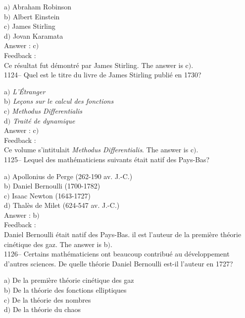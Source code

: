 ﻿\documentclass[letterpaper, 12pt]{article}
\begin{document}
a$)$ Abraham Robinson \\
b$)$ Albert Einstein \\
c$)$ James Stirling  \\
d$)$ Jovan Karamata\\

Answer : c$)$\\

Feedback : \\
Ce r\'esultat fut d\'emontr\'e par James Stirling.
The answer is c$)$.\\

1124-- Quel est le titre du livre de James Stirling publi\'e en
1730?

a$)$ {\sl L'\'Etranger} \\
b$)$ {\sl Le\c cons sur le calcul des fonctions}  \\
c$)$ {\sl Methodus Differentialis}  \\
d$)$ {\sl Trait\'e de dynamique} \\

Answer : c$)$\\

Feedback : \\
Ce volume s'intitulait {\sl Methodus Differentialis}.
The answer is c$)$.\\

1125-- Lequel des math\'ematiciens suivants \'etait natif des
Pays-Bas?

a$)$ Apollonius de Perge (262-190 av. J.-C.) \\
b$)$ Daniel Bernoulli (1700-1782) \\
c$)$ Isaac Newton (1643-1727) \\
d$)$ Thal\`es de Milet (624-547 av. J.-C.)\\

Answer : b$)$\\

Feedback : \\
Daniel Bernoulli \'etait natif des Pays-Bas. il est l'auteur de la
premi\`ere th\'eorie cin\'etique des gaz.
The answer is b$)$.\\

1126-- Certains math\'ematiciens ont beaucoup contribu\'e au
d\'eveloppement d'autres sciences. De quelle th\'eorie Daniel
Bernoulli est-il l'auteur en 1727?

a$)$ De la premi\`ere th\'eorie cin\'etique des gaz \\
b$)$ De la th\'eorie des fonctions elliptiques \\
c$)$ De la th\'eorie des nombres \\
d$)$ De la th\'eorie du chaos\\
\end{document}

